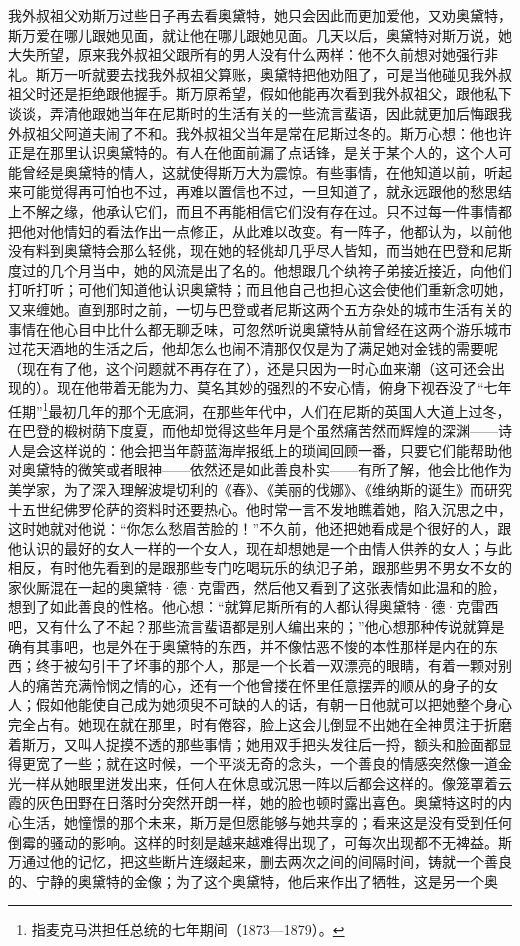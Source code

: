 \par 我外叔祖父劝斯万过些日子再去看奥黛特，她只会因此而更加爱他，又劝奥黛特，斯万爱在哪儿跟她见面，就让他在哪儿跟她见面。几天以后，奥黛特对斯万说，她大失所望，原来我外叔祖父跟所有的男人没有什么两样：他不久前想对她强行非礼。斯万一听就要去找我外叔祖父算账，奥黛特把他劝阻了，可是当他碰见我外叔祖父时还是拒绝跟他握手。斯万原希望，假如他能再次看到我外叔祖父，跟他私下谈谈，弄清他跟她当年在尼斯时的生活有关的一些流言蜚语，因此就更加后悔跟我外叔祖父阿道夫闹了不和。我外叔祖父当年是常在尼斯过冬的。斯万心想：他也许正是在那里认识奥黛特的。有人在他面前漏了点话锋，是关于某个人的，这个人可能曾经是奥黛特的情人，这就使得斯万大为震惊。有些事情，在他知道以前，听起来可能觉得再可怕也不过，再难以置信也不过，一旦知道了，就永远跟他的愁思结上不解之缘，他承认它们，而且不再能相信它们没有存在过。只不过每一件事情都把他对他情妇的看法作出一点修正，从此难以改变。有一阵子，他都认为，以前他没有料到奥黛特会那么轻佻，现在她的轻佻却几乎尽人皆知，而当她在巴登和尼斯度过的几个月当中，她的风流是出了名的。他想跟几个纨袴子弟接近接近，向他们打听打听；可他们知道他认识奥黛特；而且他自己也担心这会使他们重新念叨她，又来缠她。直到那时之前，一切与巴登或者尼斯这两个五方杂处的城市生活有关的事情在他心目中比什么都无聊乏味，可忽然听说奥黛特从前曾经在这两个游乐城市过花天酒地的生活之后，他却怎么也闹不清那仅仅是为了满足她对金钱的需要呢（现在有了他，这个问题就不再存在了），还是只因为一时心血来潮（这可还会出现的）。现在他带着无能为力、莫名其妙的强烈的不安心情，俯身下视吞没了“七年任期”\footnote{指麦克马洪担任总统的七年期间（1873—1879）。}最初几年的那个无底洞，在那些年代中，人们在尼斯的英国人大道上过冬，在巴登的椴树荫下度夏，而他却觉得这些年月是个虽然痛苦然而辉煌的深渊——诗人是会这样说的：他会把当年蔚蓝海岸报纸上的琐闻回顾一番，只要它们能帮助他对奥黛特的微笑或者眼神——依然还是如此善良朴实——有所了解，他会比他作为美学家，为了深入理解波堤切利的《春》、《美丽的伐娜》、《维纳斯的诞生》而研究十五世纪佛罗伦萨的资料时还要热心。他时常一言不发地瞧着她，陷入沉思之中，这时她就对他说：“你怎么愁眉苦脸的！”不久前，他还把她看成是个很好的人，跟他认识的最好的女人一样的一个女人，现在却想她是一个由情人供养的女人；与此相反，有时他先看到的是跟那些专门吃喝玩乐的纨氾子弟，跟那些男不男女不女的家伙厮混在一起的奥黛特·德·克雷西，然后他又看到了这张表情如此温和的脸，想到了如此善良的性格。他心想：“就算尼斯所有的人都认得奥黛特·德·克雷西吧，又有什么了不起？那些流言蜚语都是别人编出来的；”他心想那种传说就算是确有其事吧，也是外在于奥黛特的东西，并不像怙恶不悛的本性那样是内在的东西；终于被勾引干了坏事的那个人，那是一个长着一双漂亮的眼睛，有着一颗对别人的痛苦充满怜悯之情的心，还有一个他曾搂在怀里任意摆弄的顺从的身子的女人；假如他能使自己成为她须臾不可缺的人的话，有朝一日他就可以把她整个身心完全占有。她现在就在那里，时有倦容，脸上这会儿倒显不出她在全神贯注于折磨着斯万，又叫人捉摸不透的那些事情；她用双手把头发往后一捋，额头和脸面都显得更宽了一些；就在这时候，一个平淡无奇的念头，一个善良的情感突然像一道金光一样从她眼里迸发出来，任何人在休息或沉思一阵以后都会这样的。像笼罩着云霞的灰色田野在日落时分突然开朗一样，她的脸也顿时露出喜色。奥黛特这时的内心生活，她憧憬的那个未来，斯万是但愿能够与她共享的；看来这是没有受到任何倒霉的骚动的影响。这样的时刻是越来越难得出现了，可每次出现都不无裨益。斯万通过他的记忆，把这些断片连缀起来，删去两次之间的间隔时间，铸就一个善良的、宁静的奥黛特的金像；为了这个奥黛特，他后来作出了牺牲，这是另一个奥